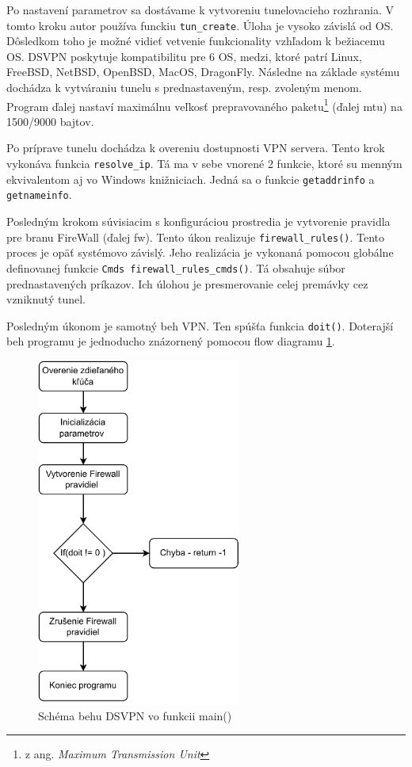 Po nastavení parametrov sa dostávame k vytvoreniu tunelovacieho rozhrania. V tomto kroku autor používa funckiu \lstinline|tun_create|. Úloha je vysoko závislá od OS. Dôsledkom toho je možné vidieť vetvenie funkcionality vzhľadom k bežiacemu OS. DSVPN poskytuje kompatibilitu pre 6 OS, medzi, ktoré patrí Linux, FreeBSD, NetBSD, OpenBSD, MacOS, DragonFly. Následne na základe systému dochádza k vytváraniu tunelu s prednastaveným, resp. zvoleným menom. Program ďalej nastaví maximálnu veľkosť prepravovaného paketu\footnote{z ang. \textit{Maximum Transmission Unit}} (ďalej \acrshort{mtu}) na 1500/9000 bajtov. 
 
Po príprave tunelu dochádza k overeniu dostupnosti VPN servera. Tento krok vykonáva funkcia \lstinline|resolve_ip|. Tá ma v sebe vnorené 2 funkcie, ktoré su menným ekvivalentom aj vo Windows knižniciach. Jedná sa o funkcie \lstinline|getaddrinfo| a \lstinline|getnameinfo|.  
 
Posledným krokom súvisiacim s konfiguráciou prostredia je vytvorenie pravidla pre branu FireWall (ďalej \acrshort{fw}). Tento úkon realizuje \lstinline|firewall_rules()|. Tento proces je opäť systémovo závislý. Jeho realizácia je vykonaná pomocou globálne definovanej funkcie \lstinline|Cmds firewall_rules_cmds()|. Tá obsahuje súbor prednastavených príkazov. Ich úlohou je presmerovanie celej premávky cez vzniknutý tunel.
 
Posledným úkonom je samotný beh VPN. Ten spúšťa funkcia \lstinline|doit()|. Doterajší beh programu je jednoducho znázornený pomocou flow diagramu \ref{fc1}.
 
\begin{figure}
	\centering
	\includegraphics[width=0.6\textwidth]{figures/fc1}
	\caption{Schéma behu DSVPN vo funkcii main()}
	\label{fc1}
\end{figure}

